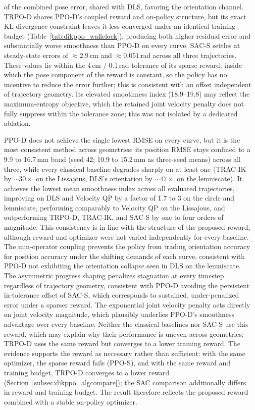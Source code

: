 of the combined pose error, shared with DLS, favoring the orientation channel. TRPO-D shares
PPO-D's coupled reward and on-policy structure, but its exact KL-divergence constraint leaves it
less converged under an identical training budget (Table~\ref{tab:dikppo_wallclock}), producing both
higher residual error and substantially worse smoothness than PPO-D on every curve. SAC-S settles at
steady-state errors of $\approx 2.9$\,cm and $\approx 0.051$\,rad across all three trajectories.
These values lie within the 4\,cm / 0.1\,rad tolerance of its sparse reward, inside which the pose
component of the reward is constant, so the policy has no incentive to reduce the error further;
this is consistent with an offset independent of trajectory geometry. Its elevated smoothness index
(18.9--19.8) may reflect the maximum-entropy objective, which the retained joint velocity penalty
does not fully suppress within the tolerance zone; this was not isolated by a dedicated ablation.

PPO-D does not achieve the single lowest RMSE on every curve, but it is the most consistent method
across geometries: its position RMSE stays confined to a 9.9 to 16.7\,mm band (seed 42; 10.9 to
15.2\,mm as three-seed means) across all three, while every classical baseline degrades sharply on
at least one (TRAC-IK by $\sim 30\times$ on the Lissajous, DLS's orientation by $\sim 47\times$ on
the lemniscate). It achieves the lowest mean smoothness index across all evaluated trajectories,
improving on DLS and Velocity QP by a factor of 1.7 to 3 on the circle and lemniscate, performing
comparably to Velocity QP on the Lissajous, and outperforming TRPO-D, TRAC-IK, and SAC-S by one to
four orders of magnitude. This consistency is in line with the structure of the proposed reward,
although reward and optimizer were not varied independently for every baseline. The min-operator
coupling prevents the policy from trading orientation accuracy for position accuracy under the
shifting demands of each curve, consistent with PPO-D not exhibiting the orientation collapse seen
in DLS on the lemniscate. The asymmetric progress shaping penalizes stagnation at every timestep
regardless of trajectory geometry, consistent with PPO-D avoiding the persistent in-tolerance offset
of SAC-S, which corresponds to sustained, under-penalized error under a sparser reward. The
exponential joint velocity penalty acts directly on joint velocity magnitude, which plausibly
underlies PPO-D's smoothness advantage over every baseline. Neither the classical baselines nor
SAC-S use this reward, which may explain why their performance is uneven across geometries; TRPO-D
uses the same reward but converges to a lower training reward. The evidence supports the reward as
necessary rather than sufficient: with the same optimizer, the sparse reward fails (PPO-S), and with
the same reward and training budget, TRPO-D converges to a lower reward
(Section~\ref{subsec:dikppo_algcompare}); the SAC comparison additionally differs in reward and
training budget. The result therefore reflects the proposed reward combined with a stable on-policy
optimizer.

